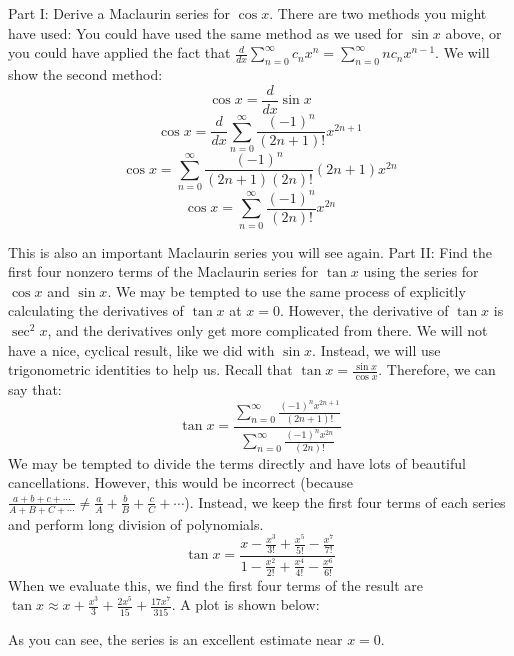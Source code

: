 \begin{Answer}[ref = trigmac]
Part I: Derive a Maclaurin series for $\cos{x}$. There are two methods you 
might have used: You could have used the same method as we used for $\sin{x}$ 
above, or you could have applied the fact that $\frac{d}{dx} \sum_{n=0}^\infty 
c_n x^n = \sum_{n=0}^\infty n c_n x^{n - 1}$. We will show the second method:
$$\cos{x} = \frac{d}{dx} \sin{x}$$
$$\cos{x} = \frac{d}{dx} \sum_{n=0}^\infty \frac{(-1)^n}{(2n + 1)!}x^{2n + 1}$$
$$\cos{x} = \sum_{n=0}^\infty \frac{(-1)^n}{(2n + 1)(2n)!} \left(2n + 1 
\right) x^{2n}$$ 
$$\cos{x} = \sum_{n=0}^\infty \frac{(-1)^n}{(2n)!}x^{2n}$$

This is also an important Maclaurin series you will see again. 
Part II: Find the first four nonzero terms of the Maclaurin series for $\tan{x}$ using the series 
for $\cos{x}$ and $\sin{x}$. We may be tempted to use the same process of 
explicitly calculating the derivatives of $\tan{x}$ at $x = 0$. However, the 
derivative of $\tan{x}$ is $\sec^2{x}$, and the derivatives only get more 
complicated from there. We will not have a nice, cyclical result, like we did 
with $\sin{x}$. Instead, we will use trigonometric identities to help us. 
Recall that $\tan{x} = \frac{\sin{x}}{\cos{x}}$. Therefore, we can say that:
$$\tan{x} = \frac{\sum_{n=0}^\infty \frac{(-1)^n x^{2n + 1}}{(2n + 1)!}}{\sum_{
n = 0}^\infty \frac{(-1)^n x^{2n}}{(2n)!}}$$
We may be tempted to divide the terms directly and have lots of beautiful 
cancellations. However, this would be incorrect (because $\frac{a + b + c + 
\cdots}{A + B + C + \cdots} \neq \frac{a}{A} + \frac{b}{B} + \frac{c}{C} + 
\cdots$). Instead, we keep the first four terms of each series and perform long
division of polynomials. 
$$\tan{x} = \frac{x - \frac{x^3}{3!} + \frac{x^5}{5!} - \frac{x^7}{7!}}{1 - 
\frac{x^2}{2!} + \frac{x^4}{4!} - \frac{x^6}{6!}}$$
When we evaluate this, we find the first four terms of the result are $\tan{x} 
\approx x + \frac{x^3}{3} + \frac{2x^5}{15} + \frac{17x^7}{315}$. A plot is 
shown below:

\centering
As you can see, the series is an excellent estimate near $x = 0$. 
\end{Answer}

